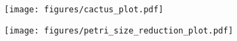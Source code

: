%



\begin{center}
	\begin{minipage}[htbp]{0.48\textwidth}
		\centering
		\texttt{[image: figures/cactus\_plot.pdf]}
		\label{fig:timeout_cumulative_solved_log}
	\end{minipage}\hfill
	\begin{minipage}[htbp]{0.48\textwidth}
		\centering
		\texttt{[image: figures/petri\_size\_reduction\_plot.pdf]}
		\label{fig:petri_size_reduction}
	\end{minipage}
\end{center}


